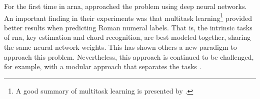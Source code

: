 

For the first time in \gls{arna},
\textcite{chen2018functional} approached the problem using
deep neural networks. An important finding in their
experiments was that multitask learning\footnote{A good
summary of multitask learning is presented by
\textcite{ruder2017overview}.} provided better results when
predicting Roman numeral labels. That is, the intrinsic
tasks of \gls{rna}, key estimation and chord recognition,
are best modeled together, sharing the same neural network
weights. This has shown others a new paradigm to approach
this problem. Nevertheless, this approach is continued to be
challenged, for example, with a modular approach that
separates the tasks \parencite{mcleod2021modular}.

